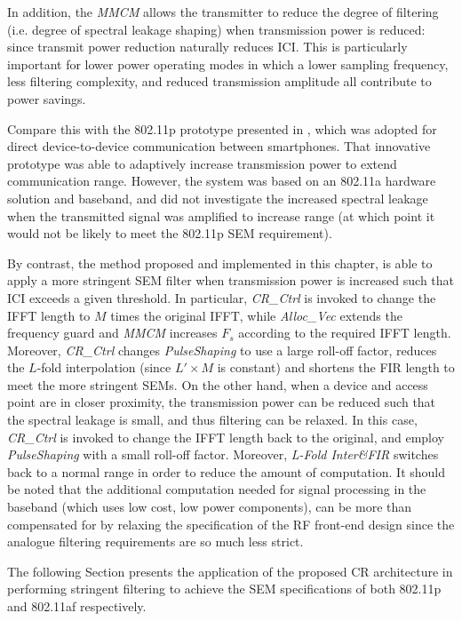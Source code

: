 In addition, the \emph{MMCM} allows the transmitter to reduce the degree of filtering (i.e. degree of spectral leakage shaping) when transmission power is reduced: since transmit power reduction naturally reduces ICI.
This is particularly important for lower power operating modes in which a lower sampling frequency, less filtering complexity, and reduced transmission amplitude all contribute to power savings.

Compare this with the 802.11p prototype presented in \cite{Choi2014}, which was adopted for direct device-to-device communication between smartphones.
That innovative prototype was able to adaptively increase transmission power to extend communication range.
However, the system was based on an 802.11a hardware solution and baseband, and did not investigate the increased spectral leakage when the transmitted signal was amplified to increase range (at which point it would not be likely to meet the 802.11p SEM requirement).

By contrast, the method proposed and implemented in this chapter, is able to apply a more stringent SEM filter when transmission power is increased such that ICI exceeds a given threshold.
In particular, \emph{CR\_Ctrl} is invoked to change the IFFT length to $M$ times the original IFFT, while \emph{Alloc\_Vec} extends the frequency guard and \emph{MMCM} increases $\mathit{F_s}$ according to the required IFFT length.
Moreover, \emph{CR\_Ctrl} changes \emph{PulseShaping} to use a large roll-off factor, reduces the $L$-fold interpolation (since $L'\times M$ is constant) and shortens the FIR length to meet the more stringent SEMs.
On the other hand, when a device and access point are in closer proximity, the transmission power can be reduced such that the spectral leakage is small, and thus filtering can be relaxed.
In this case, \emph{CR\_Ctrl} is invoked to change the IFFT length back to the original, and employ \emph{PulseShaping} with a small roll-off factor. Moreover, \emph{L-Fold Inter\&FIR} switches back to a normal range in order to reduce the amount of computation.
It should be noted that the additional computation needed for signal processing in the baseband (which uses low cost, low power components), can be more than compensated for by relaxing the specification of the RF front-end design since the analogue filtering requirements are so much less strict.

The following Section presents the application of the proposed CR architecture in performing stringent filtering to achieve the SEM specifications of both 802.11p and 802.11af respectively.

